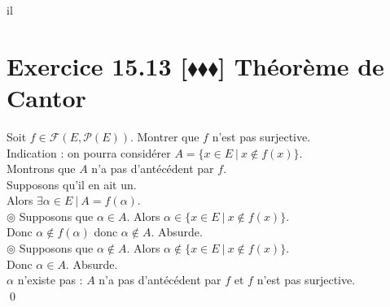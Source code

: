 il\documentclass[10pt]{article}
\begin{document}

\section*{Exercice 15.13 [$\blacklozenge\blacklozenge\blacklozenge$] Théorème de Cantor}
\begin{tcolorbox}[enhanced, width=7.6in, center, size=fbox, fontupper=\large, drop shadow southwest]
    Soit $f\in\mathcal{F}(E, \mathcal{P}(E))$. Montrer que $f$ n'est pas surjective.\\
    Indication : on pourra considérer $A = \{x \in E ~ | ~ x \notin f(x)\}$.\\[0.2cm]
    Montrons que $A$ n'a pas d'antécédent par $f$.\\
    Supposons qu'il en ait un.\\
    Alors $\exists \alpha \in E ~ | ~ A = f(\alpha)$.\\
    $\circledcirc$ Supposons que $\alpha \in A$. Alors $\alpha \in \{x \in E ~ | ~ x \notin f(x)\}$.\\
    Donc $\alpha \notin f(\alpha)$ donc $\alpha \notin A$. Absurde.\\[0.15cm]
    $\circledcirc$ Supposons que $\alpha \notin A$. Alors $\alpha \notin \{x \in E ~ | ~ x \notin f(x)\}$.\\
    Donc $\alpha \in A$. Absurde.\\[0.15cm]
    $\alpha$ n'existe pas : $A$ n'a pas d'antécédent par $f$ et $f$ n'est pas surjective.\\
    \qed
\end{tcolorbox}
\end{document}
